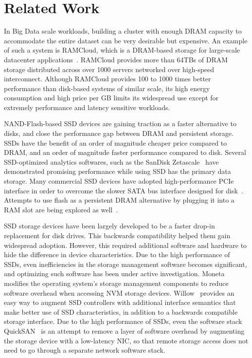 
\section{Related Work}
\label{sec:related}


In Big Data scale workloads, building a cluster with enough DRAM capacity to
accommodate the entire dataset can be very desirable but expensive. An example
of such a system is RAMCloud, which is a DRAM-based storage for large-scale
datacenter applications~\cite{ramcloud, rumble_log_dram}.  RAMCloud provides more than 64TBs of DRAM
storage distributed across over 1000 servers networked over high-speed
interconnect. Although RAMCloud provides 100 to 1000 times better performance
than disk-based systems of similar scale, its high energy consumption and high
price per GB limits its widespread use except for extremely performance and
latency sensitive workloads.

NAND-Flash-based SSD devices are gaining traction as a faster alternative to
disks, and close the performance gap between DRAM and persistent storage.
SSDs have the benefit of an order of magnitude cheaper price compared to DRAM,
and an order of magnitude faster performance compared to disk.
Several SSD-optimized analytics softwares, such as the SanDisk
Zetascale~\cite{zetascale} have demonstrated promising
performance while using SSD has the primary data storage.
Many commercial SSD devices have adopted high-performance PCIe interface in
order to overcome the slower SATA bus interface designed for
disk~\cite{fusionio, violinmemory, intelnvme}. Attempts to
use flash as a persistent DRAM alternative by plugging it into a RAM slot
are being explored as well~\cite{diablotechnology}. 

SSD storage devices have been largely developed to be a faster drop-in
replacement for disk drives. This backwards compatibility helped them gain
widespread adoption.  However, this required additional software and hardware to
hide the difference in device characteristics.  Due to the high performance of
SSDs, even inefficiencies in the storage management software becomes
significant, and optimizing such software has been under active investigation.
Moneta~\cite{ucsd_moneta} modifies the operating system's storage management
components to reduce software overhead when accessing NVM storage devices.
Willow~\cite{ucsd_willow} provides an easy way to augment SSD controllers with
additional interface semantics that make better use of SSD characteristics, in
addition to a backwards compatible storage interface.  Due to the high
performance of SSDs, even the software stack QuickSAN~\cite{ucsd_quicksan} is an
attempt to remove a layer of software overhead by augmenting the storage device
with a low-latency NIC, so that remote storage access does not need to go
through a separate network software stack.

